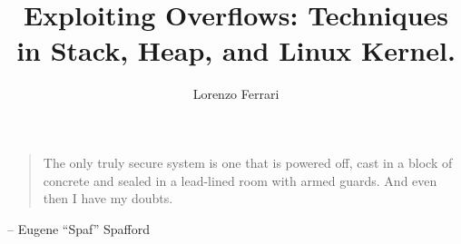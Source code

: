 \documentclass{theme/uniprthesis}
\title{Exploiting Overflows: Techniques in Stack, Heap, and Linux Kernel.}
\author{Lorenzo Ferrari}
\begin{document}
    
 
\maketitle
\newpage

\mbox{} %


\blockquote{The only truly secure system is one that is powered off, cast in a block of concrete and sealed in a lead-lined room with armed guards. And even then I have my doubts.} \par
\hspace*{\fill} -- Eugene “Spaf” Spafford 

\newpage

\renewcommand{\contentsname}{Index}
\tableofcontents
    
    
    





\end{document}
